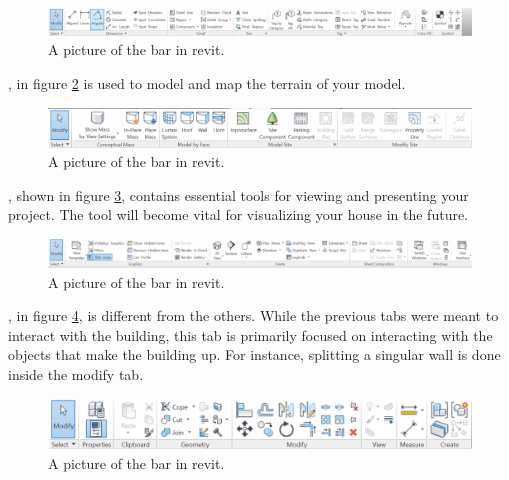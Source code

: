 \documentclass{tufte-book} %
\begin{document}
\begin{figure}
	\includegraphics[width=\linewidth]{revitannotationbar.png}
	\caption[The annotation bar]{A picture of the  bar in revit.}
	\label{fig:revanntab}
\end{figure}



, in figure \ref{fig:revmastab} is used to model and map the terrain of your model.

\begin{figure}
	\includegraphics[width=\linewidth]{revitmassingsitebar.png}
	\caption[The massing and site bar]{A picture of the  bar in revit.}
	\label{fig:revmastab}
\end{figure}


, shown in figure \ref{fig:revviewtab}, contains essential tools for viewing and presenting your project. The \mbox{} tool will become vital for visualizing your house in the future.


\begin{figure}
	\includegraphics[width=\linewidth]{revitviewtab.png}
	\caption[The view bar]{A picture of the  bar in revit.}
	\label{fig:revviewtab}
\end{figure}

, in figure \ref{fig:revmodtab}, is different from the others. While the previous tabs were meant to interact with the building, this tab is primarily focused on interacting with the objects that make the building up. For instance, splitting a singular wall is done inside the modify tab.

\begin{figure}
	\includegraphics[width=\linewidth]{revitmodifytab.png}
	\caption[The modify bar]{A picture of the  bar in revit.}
	\label{fig:revmodtab}
\end{figure}
\end{document}
